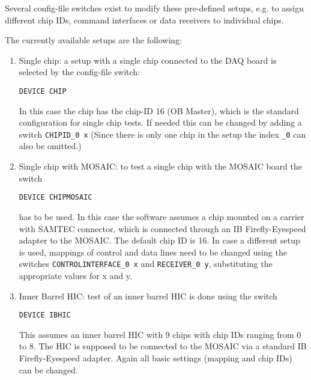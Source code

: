 \documentclass{article}
\begin{document}
Several config-file switches exist to modify these pre-defined setups, e.g. to assign different chip IDs, command interfaces or data receivers to individual chips.

The currently available setups are the following: 

\begin {enumerate}
\item Single chip: a setup with a single chip connected to the DAQ board is selected by the config-file switch: 
\begin{verbatim} 
DEVICE CHIP
\end{verbatim}

In this case the chip has the chip-ID 16 (OB Master), which is the standard configuration for single chip tests. If needed this can be changed by adding a switch \texttt{CHIPID\_0 x} (Since there is only one chip in the setup the index \texttt{\_0} can also be omitted.)

\item Single chip with MOSAIC: to test a single chip with the MOSAIC board the switch 
\begin{verbatim}
DEVICE CHIPMOSAIC
\end{verbatim}
has to be used. In this case the software assumes a chip mounted on a carrier with SAMTEC connector, which is connected through an IB Firefly-Eyespeed adapter to the MOSAIC. The default chip ID is 16. In case a different setup is used, mappings of control and data lines need to be changed using the switches \texttt{CONTROLINTERFACE\_0 x} and \texttt{RECEIVER\_0 y}, substituting the appropriate values for x and y. 

\item Inner Barrel HIC: test of an inner barrel HIC is done using the switch
\begin{verbatim} 
DEVICE IBHIC
\end{verbatim}
This assumes an inner barrel HIC with 9 chips with chip IDs ranging from 0 to 8. The HIC is supposed to be connected to the MOSAIC via a standard IB Firefly-Eyespeed adapter. Again all basic settings (mapping and chip IDs) can be changed.


\end{enumerate}
\end{document}
